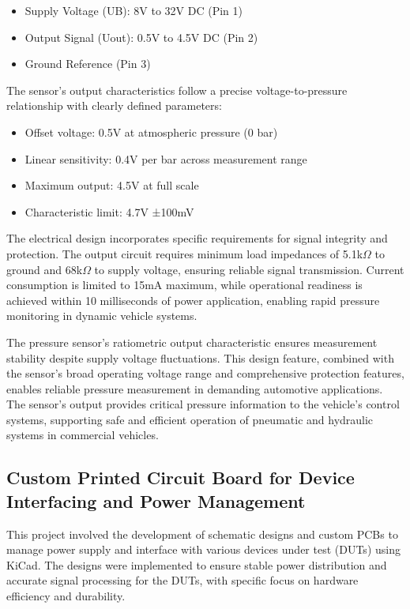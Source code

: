 \documentclass[12pt]{article}
\begin{document}
\begin{itemize} \item Supply Voltage (UB): 8V to 32V DC (Pin 1) \item Output
Signal (Uout): 0.5V to 4.5V DC (Pin 2) \item Ground Reference (Pin 3)
\end{itemize}

The sensor's output characteristics follow a precise voltage-to-pressure
relationship with clearly defined parameters:

\begin{itemize} \item Offset voltage: 0.5V at atmospheric pressure (0 bar)
\item Linear sensitivity: 0.4V per bar across measurement range \item Maximum
output: 4.5V at full scale \item Characteristic limit: 4.7V ±100mV
\end{itemize}

The electrical design incorporates specific requirements for signal integrity
and protection. The output circuit requires minimum load impedances of 5.1k$\Omega$
to
ground and 68k$\Omega$ to supply voltage, ensuring reliable signal transmission.
Current consumption is limited to 15mA maximum, while operational readiness is
achieved within 10 milliseconds of power application, enabling rapid pressure
monitoring in dynamic vehicle systems.

The pressure sensor's ratiometric output characteristic ensures measurement
stability despite supply voltage fluctuations. This design feature, combined
with the sensor's broad operating voltage range and comprehensive protection
features, enables reliable pressure measurement in demanding automotive
applications. The sensor's output provides critical pressure information to the
vehicle's control systems, supporting safe and efficient operation of pneumatic
and hydraulic systems in commercial vehicles.

\subsection{Custom Printed Circuit Board for Device Interfacing and Power Management}
This project involved the development of schematic designs and custom PCBs to
manage power supply and interface with various devices under test (DUTs) using
KiCad. The designs were implemented to ensure stable power distribution and
accurate signal processing for the DUTs, with specific focus on hardware
efficiency and durability.
\end{document}
